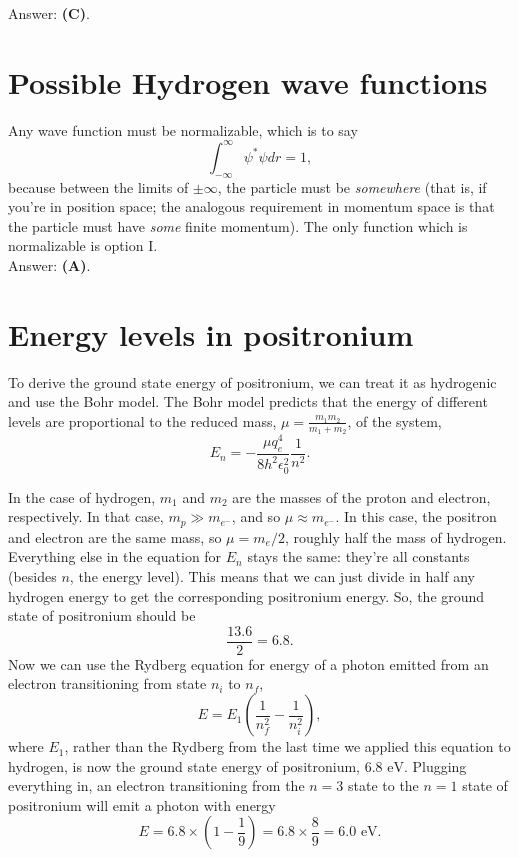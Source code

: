 \documentclass[11pt]{paper}
\newcommand{\answer}[1]{Answer: \textbf{(#1)}.}
\begin{document}
\answer{C}

\section{Possible Hydrogen wave functions}
Any wave function must be normalizable, which is to say
\begin{equation}
\int_{-\infty}^\infty \psi^*\psi dr = 1,
\end{equation}
because between the limits of $\pm\infty$, the particle must be \emph{somewhere} (that is, if you're in position space; the analogous requirement in momentum space is that the particle must have \emph{some} finite momentum).  The only function which is normalizable is option I.\\

\answer{A}  

\section{Energy levels in positronium}
To derive the ground state energy of positronium, we can treat it as hydrogenic and use the Bohr model.  The Bohr model predicts that the energy of different levels are proportional to the reduced mass, $\mu = \frac{m_1 m_2}{m_1 + m_2}$, of the system,
\begin{equation}
E_n = -\frac{\mu q_e^4}{8 h^2\epsilon_0^2} \frac{1}{n^2}.
\end{equation}

In the case of hydrogen, $m_1$ and $m_2$ are the masses of the proton and electron, respectively.  In that case, $m_p \gg m_{e^-}$, and so $\mu\approx m_{e^-}$.  In this case, the positron and electron are the same mass, so $\mu = m_e/2$, roughly half the mass of hydrogen.  Everything else in the equation for $E_n$ stays the same: they're all constants (besides $n$, the energy level).  This means that we can just divide in half any hydrogen energy to get the corresponding positronium energy.  So, the ground state of positronium should be
\begin{equation}
\frac{13.6}{2} = 6.8.
\end{equation}
Now we can use the Rydberg equation for energy of a photon emitted from an electron transitioning from state $n_i$ to $n_f$,
\begin{equation}
E = E_1 \left(\frac{1}{n_f^2} - \frac{1}{n_i^2}\right),
\end{equation}
where $E_1$, rather than the Rydberg from the last time we applied this equation to hydrogen, is now the ground state energy of positronium, $6.8 \text{ eV}$.  Plugging everything in, an electron transitioning from the $n = 3$ state to the $n=1$ state of positronium will emit a photon with energy
\begin{equation}
E = 6.8 \times \left(1 - \frac{1}{9}\right) = 6.8 \times \frac{8}{9} = 6.0 \text{ eV}.
\end{equation}
\end{document}
